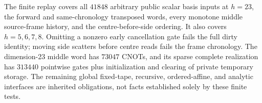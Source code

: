 The finite replay covers all $41848$ arbitrary public scalar basis inputs at
$h=23$, the forward and same-chronology transposed words, every monotone middle
source-frame history, and the centre-before-side ordering. It also covers
$h=5,6,7,8$. Omitting a nonzero early cancellation gate fails the full dirty
identity; moving side scatters before centre reads fails the frame chronology.
The dimension-23 middle word has $73047$ CNOTs, and its sparse complete
realization has $313440$ pointwise gates plus initialization and clearing of
private temporary storage. The remaining global fixed-tape, recursive,
ordered-affine, and analytic interfaces are inherited obligations, not facts
established solely by these finite tests.

